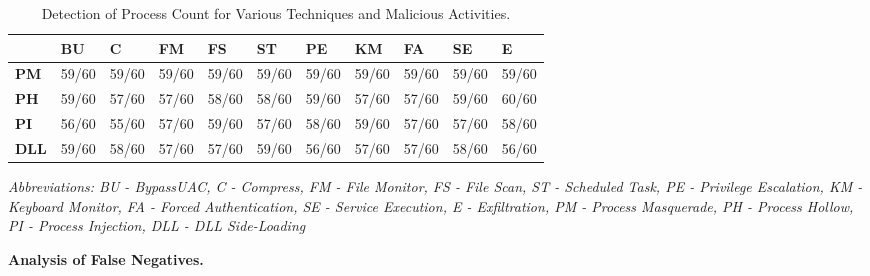 \begin{table}[h!]
    \centering
    \begin{tabularx}{\textwidth}{|X|X|X|X|X|X|X|X|X|X|X|}
        \hline
        & \textbf{BU} & \textbf{C} & \textbf{FM} & \textbf{FS} & \textbf{ST} & \textbf{PE} & \textbf{KM} & \textbf{FA} & \textbf{SE} & \textbf{E} \\
        \hline
\multicolumn{1}{|l|}{\textbf{PM}} & \multicolumn{1}{l|}{59/60}   & \multicolumn{1}{l|}{59/60}  & \multicolumn{1}{l|}{59/60}   & \multicolumn{1}{l|}{59/60}   & \multicolumn{1}{l|}{59/60}   & \multicolumn{1}{l|}{59/60}   & \multicolumn{1}{l|}{59/60}   & \multicolumn{1}{l|}{59/60}   & \multicolumn{1}{l|}{59/60}   & \multicolumn{1}{l|}{59/60}  \\ \hline
\multicolumn{1}{|l|}{\textbf{PH}} & \multicolumn{1}{l|}{59/60}   & \multicolumn{1}{l|}{57/60}  & \multicolumn{1}{l|}{57/60}   & \multicolumn{1}{l|}{58/60}   & \multicolumn{1}{l|}{58/60}   & \multicolumn{1}{l|}{59/60}   & \multicolumn{1}{l|}{57/60}   & \multicolumn{1}{l|}{57/60}   & \multicolumn{1}{l|}{59/60}   & \multicolumn{1}{l|}{60/60}  \\ \hline
\multicolumn{1}{|l|}{\textbf{PI}} & \multicolumn{1}{l|}{56/60}   & \multicolumn{1}{l|}{55/60}  & \multicolumn{1}{l|}{57/60}   & \multicolumn{1}{l|}{59/60}   & \multicolumn{1}{l|}{57/60}   & \multicolumn{1}{l|}{58/60}   & \multicolumn{1}{l|}{59/60}   & \multicolumn{1}{l|}{57/60}   & \multicolumn{1}{l|}{57/60}   & \multicolumn{1}{l|}{58/60}  \\ \hline
\textbf{DLL}                      & 59/60                        & 58/60                       & 57/60                        & 57/60                        & 59/60                        & 56/60                        & 57/60                        & 57/60                        & 58/60                        & 56/60                       \\ 
        \hline
    \end{tabularx}
    \caption{Detection of Process Count for Various Techniques and Malicious Activities.}
    \smallskip
    \small \textit{Abbreviations: BU - BypassUAC, C - Compress, FM - File Monitor, FS - File Scan, ST - Scheduled Task, PE - Privilege Escalation, KM - Keyboard Monitor, FA - Forced Authentication, SE - Service Execution, E - Exfiltration, PM - Process Masquerade, PH - Process Hollow, PI - Process Injection, DLL - DLL Side-Loading}
    \label{table:eva-attack}
\end{table}
\smallskip
\noindent
{\bf Analysis of False Negatives.}
